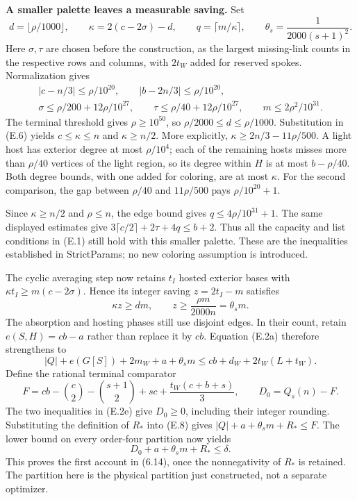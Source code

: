 \documentclass[english,11pt,a4paper]{article}
\begin{document}
\textbf{A smaller palette leaves a measurable saving.} Set \[
d=\lfloor\rho/1000\rfloor,\qquad
\kappa=2(c-2\sigma)-d,\qquad
q=\lceil m/\kappa\rceil,\qquad
\theta_s=\frac1{2000(s+1)^2}.
\tag{E.6}
\] Here \(\sigma,\tau\) are chosen before the construction, as the largest missing-link counts in the respective rows and columns, with \(2t_W\) added for reserved spokes. Normalization gives \[
\begin{gathered}
|c-n/3|\le\rho/10^{20},\qquad
|b-2n/3|\le\rho/10^{20},\\
\sigma\le\rho/200+12\rho/10^{27},\qquad
\tau\le\rho/40+12\rho/10^{27},\qquad
m\le2\rho^2/10^{31}.
\end{gathered}
\] The terminal threshold gives \(\rho\ge10^{50}\), so \(\rho/2000\le d\le\rho/1000\). Substitution in (E.6) yields \(c\le\kappa\le n\) and \(\kappa\ge n/2\). More explicitly, \(\kappa\ge2n/3-11\rho/500\). A light host has exterior degree at most \(\rho/10^4\); each of the remaining hosts misses more than \(\rho/40\) vertices of the light region, so its degree within \(H\) is at most \(b-\rho/40\). Both degree bounds, with one added for coloring, are at most \(\kappa\). For the second comparison, the gap between \(\rho/40\) and \(11\rho/500\) pays \(\rho/10^{20}+1\).

Since \(\kappa\ge n/2\) and \(\rho\le n\), the edge bound gives \(q\le4\rho/10^{31}+1\). The same displayed estimates give \(3\lceil c/2\rceil+2\tau+4q\le b+2\). Thus all the capacity and list conditions in (E.1) still hold with this smaller palette. These are the inequalities established in StrictParams; no new coloring assumption is introduced.

The cyclic averaging step now retains \(t_I\) hosted exterior bases with \(\kappa t_I\ge m(c-2\sigma)\). Hence its integer saving \(z=2t_I-m\) satisfies \[
\kappa z\ge dm,\qquad
z\ge\frac{\rho m}{2000n}=\theta_s m.
\tag{E.7}
\] The absorption and hosting phases still use disjoint edges. In their count, retain \(e(S,H)=cb-a\) rather than replace it by \(cb\). Equation (E.2a) therefore strengthens to \[
|Q|+e(G[S])+2m_W+a+\theta_s m
\le cb+d_W+2t_W(L+t_W).
\tag{E.8}
\] Define the rational terminal comparator \[
F=cb-\binom c2-\binom{s+1}2+sc+
       \frac{t_W(c+b+s)}3,\qquad
D_0=Q_s(n)-F.
\] The two inequalities in (E.2e) give \(D_0\ge0\), including their integer rounding. Substituting the definition of \(R_*\) into (E.8) gives \(|Q|+a+\theta_s m+R_*\le F\). The lower bound on every order-four partition now yields \[
D_0+a+\theta_s m+R_*\le\delta.
\tag{E.9}
\] This proves the first account in (6.14), once the nonnegativity of \(R_*\) is retained. The partition here is the physical partition just constructed, not a separate optimizer.
\end{document}
